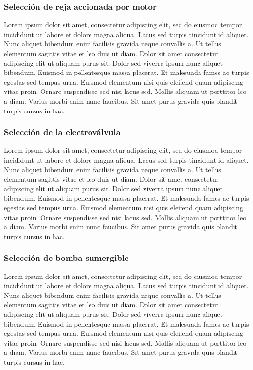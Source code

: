 \subsubsection{Selección de reja accionada por motor}

Lorem ipsum dolor sit amet, consectetur adipiscing elit, sed do eiusmod tempor incididunt ut labore et dolore magna aliqua. Lacus sed turpis tincidunt id aliquet. Nunc aliquet bibendum enim facilisis gravida neque convallis a. Ut tellus elementum sagittis vitae et leo duis ut diam. Dolor sit amet consectetur adipiscing elit ut aliquam purus sit. Dolor sed viverra ipsum nunc aliquet bibendum. Euismod in pellentesque massa placerat. Et malesuada fames ac turpis egestas sed tempus urna. Euismod elementum nisi quis eleifend quam adipiscing vitae proin. Ornare suspendisse sed nisi lacus sed. Mollis aliquam ut porttitor leo a diam. Varius morbi enim nunc faucibus. Sit amet purus gravida quis blandit turpis cursus in hac.

\subsubsection{Selección de la electroválvula}

Lorem ipsum dolor sit amet, consectetur adipiscing elit, sed do eiusmod tempor incididunt ut labore et dolore magna aliqua. Lacus sed turpis tincidunt id aliquet. Nunc aliquet bibendum enim facilisis gravida neque convallis a. Ut tellus elementum sagittis vitae et leo duis ut diam. Dolor sit amet consectetur adipiscing elit ut aliquam purus sit. Dolor sed viverra ipsum nunc aliquet bibendum. Euismod in pellentesque massa placerat. Et malesuada fames ac turpis egestas sed tempus urna. Euismod elementum nisi quis eleifend quam adipiscing vitae proin. Ornare suspendisse sed nisi lacus sed. Mollis aliquam ut porttitor leo a diam. Varius morbi enim nunc faucibus. Sit amet purus gravida quis blandit turpis cursus in hac.

\subsubsection{Selección de bomba sumergible}

Lorem ipsum dolor sit amet, consectetur adipiscing elit, sed do eiusmod tempor incididunt ut labore et dolore magna aliqua. Lacus sed turpis tincidunt id aliquet. Nunc aliquet bibendum enim facilisis gravida neque convallis a. Ut tellus elementum sagittis vitae et leo duis ut diam. Dolor sit amet consectetur adipiscing elit ut aliquam purus sit. Dolor sed viverra ipsum nunc aliquet bibendum. Euismod in pellentesque massa placerat. Et malesuada fames ac turpis egestas sed tempus urna. Euismod elementum nisi quis eleifend quam adipiscing vitae proin. Ornare suspendisse sed nisi lacus sed. Mollis aliquam ut porttitor leo a diam. Varius morbi enim nunc faucibus. Sit amet purus gravida quis blandit turpis cursus in hac.

